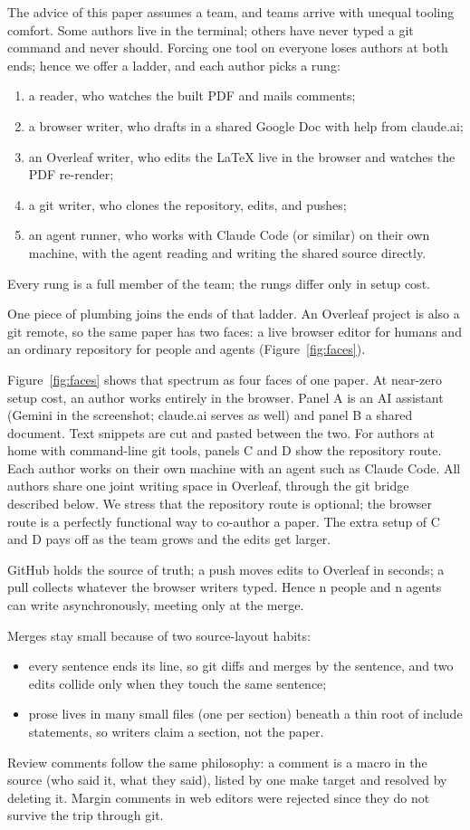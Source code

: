 The advice of this paper assumes a team, and teams arrive with
unequal tooling comfort.
Some authors live in the terminal; others have never typed a git
command and never should.
Forcing one tool on everyone loses authors at both ends; hence we
offer a ladder, and each author picks a rung:
\begin{enumerate}
\item a reader, who watches the built PDF and mails comments; \item a
browser writer, who drafts in a shared Google Doc with help from
claude.ai; \item an Overleaf writer, who edits the LaTeX live in the
browser and watches the PDF re-render; \item a git writer, who clones
the repository, edits, and pushes; \item an agent runner, who works
with Claude Code (or similar) on their own machine, with the agent
reading and writing the shared source directly.
\end{enumerate}
Every rung is a full member of the team; the rungs differ only in
setup cost.

One piece of plumbing joins the ends of that ladder.
An Overleaf project is also a git remote, so the same paper has two
faces: a live browser editor for humans and an ordinary repository for
people and agents (Figure~\ref{fig:faces}).

Figure~\ref{fig:faces} shows that spectrum as four faces of one
paper.
At near-zero setup cost, an author works entirely in the browser.
Panel A is an AI assistant (Gemini in the screenshot; claude.ai
serves as well) and panel B a shared document.
Text snippets are cut and pasted between the two.
For authors at home with command-line git tools, panels C and D
show the repository route.
Each author works on their own machine with an agent such as
Claude Code.
All authors share one joint writing space in Overleaf, through
the git bridge described below.
We stress that the repository route is optional; the browser
route is a perfectly functional way to co-author a paper.
The extra setup of C and D pays off as the team grows and the
edits get larger.

GitHub holds the source of truth; a push moves edits to Overleaf in
seconds; a pull collects whatever the browser writers typed.
Hence n people and n agents can write asynchronously, meeting only at
the merge.

Merges stay small because of two source-layout habits:
\begin{itemize}
\item every sentence ends its line, so git diffs and merges by
the sentence, and two edits collide only when they touch the same
sentence;
\item prose lives in many small files (one per section) beneath a
thin root of include statements, so writers claim a section, not
the paper.
\end{itemize}
Review comments follow the same philosophy: a comment is a macro in
the source (who said it, what they said), listed by one make target
and resolved by deleting it.
Margin comments in web editors were rejected since they do not survive
the trip through git.

